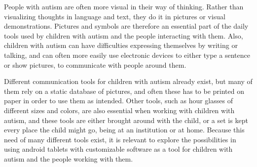 	People with autism are often more visual in their way of thinking. Rather than visualizing thoughts in language and text, they do it in pictures or visual demonstrations. Pictures and symbols are therefore an essential part of the daily tools used by children with autism and the people interacting with them. Also, children with autism can have difficulties expressing themselves by writing or talking, and can often more easily use electronic devices to either type a sentence or show pictures, to communicate with people around them.

Different communication tools for children with autism already exist, but many of them rely on a static database of pictures, and often these has to be printed on paper in order to use them as intended. Other tools, such as hour glasses of different sizes and colors, are also essential when working with children with autism, and these tools are either brought around with the child, or a set is kept every place the child might go, being at an institution or at home.
Because this need of many different tools exist, it is relevant to explore the possibilities in using android tablets with customizable software as a tool for children with autism and the people working with them.